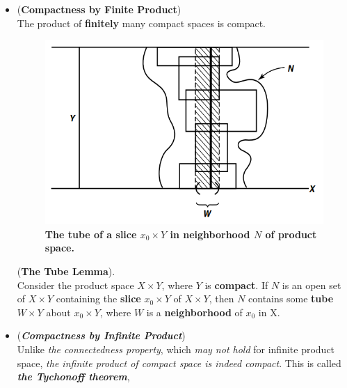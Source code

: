 \documentclass[11pt]{article}
\begin{document}
\begin{itemize}
\item \begin{proposition} (\textbf{Compactness by Finite Product}) \citep{munkres2000topology}\\
The product of \textbf{finitely} many compact spaces is compact.
\end{proposition}


\begin{figure}
\begin{minipage}[t]{1\linewidth}
  \centering
  \centerline{\includegraphics[scale = 0.45]{tube_slice_lemma.png}}
\end{minipage}
\caption{\footnotesize{\textbf{The tube of a slice $x_0 \times Y$ in neighborhood $N$ of product space. \citep{munkres2000topology}}}}
\label{fig: tube_slice_lemma}
\end{figure}

\begin{lemma} (\textbf{The Tube Lemma}).\citep{munkres2000topology} \\
Consider the product space $X \times Y$, where $Y$ is \textbf{compact}. If $N$ is an open set of $X \times Y$ containing the \textbf{slice} $x_0 \times Y$ of $X \times Y$, then $N$ contains some \textbf{tube} $W \times Y$ about $x_0 \times Y$, where $W$ is a \textbf{neighborhood} of $x_0$ in X.
\end{lemma}

\item \begin{remark}(\textbf{\emph{Compactness by Infinite Product}}) \\
Unlike \emph{the connectedness property}, which \emph{may not hold} for infinite product space, \emph{the infinite product of compact space is indeed compact}. This is called \emph{\textbf{the Tychonoff theorem}},
\end{remark}







\end{itemize}
\end{document}
